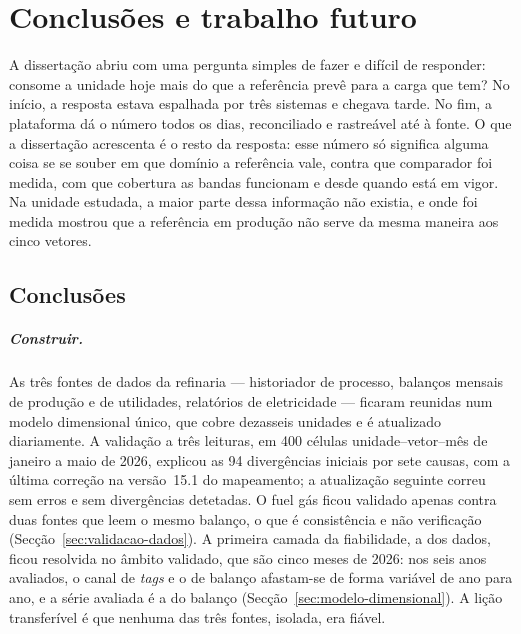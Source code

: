 
\chapter{Conclusões e trabalho futuro}
\label{cha:conclusoes}

A dissertação abriu com uma pergunta simples de fazer e difícil de
responder: consome a unidade hoje mais do que a referência prevê para a carga
que tem? No início, a resposta estava espalhada por três sistemas e chegava
tarde. No fim, a plataforma dá o número todos os dias, reconciliado e
rastreável até à fonte. O que a dissertação acrescenta é o resto da resposta:
esse número só significa alguma coisa se se souber em que domínio a
referência vale, contra que comparador foi medida, com que cobertura as
bandas funcionam e desde quando está em vigor. Na unidade estudada, a maior
parte dessa informação não existia, e onde foi medida mostrou que a
referência em produção não serve da mesma maneira aos cinco vetores.

\section{Conclusões}
\label{sec:conclusoes}

\paragraph{Construir.} As três fontes de dados da refinaria --- historiador
de processo, balanços mensais de produção e de utilidades, relatórios de
eletricidade --- ficaram reunidas num modelo dimensional único, que cobre
dezasseis unidades e é atualizado diariamente. A validação a três leituras,
em 400 células unidade--vetor--mês de janeiro a maio de 2026, explicou as 94
divergências iniciais por sete causas, com a última correção na versão~15.1
do mapeamento; a atualização seguinte correu sem erros e sem divergências
detetadas.  O fuel gás
ficou validado apenas contra duas fontes que leem o mesmo balanço, o que é
consistência e não verificação (Secção~\ref{sec:validacao-dados}). A
primeira camada da fiabilidade, a dos dados, ficou resolvida no âmbito
validado, que são cinco meses de 2026: nos seis anos avaliados, o canal de
\emph{tags} e o de balanço afastam-se de forma variável de ano para ano, e a
série avaliada é a do balanço (Secção~\ref{sec:modelo-dimensional}). A lição
transferível é que nenhuma das três fontes, isolada, era fiável.

